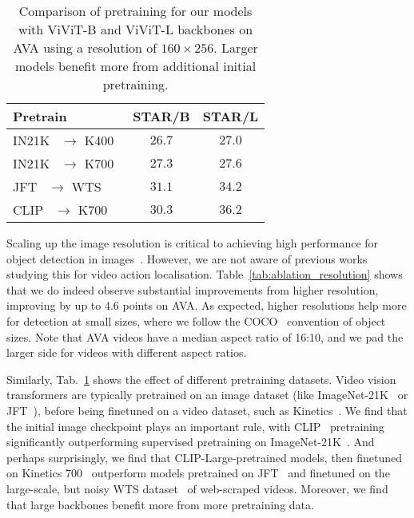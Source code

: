 \documentclass[10pt,twocolumn,letterpaper]{article}
\begin{document}
     \begin{table}[t]
\centering
\caption{
	Comparison of pretraining for our models with ViViT-B and ViViT-L backbones on AVA using a resolution of $160 \times 256$.
    Larger models benefit more from additional initial pretraining.
}
\begin{tabular}{lcc}
\toprule
Pretrain                 & STAR/B & STAR/L \\





\midrule

IN21K~\cite{deng_cvpr_2009} $\to$ K400~\cite{kay_arxiv_2017}         &   $26.7$  &  $27.0$  \\  IN21K~\cite{deng_cvpr_2009} $\to$ K700~\cite{carreira2019short}         &  $27.3$  &  $27.6$   \\  JFT~\cite{sun_iccv_2017} $\to$ WTS~\cite{stroud2020learning}          &   $\mathbf{31.1}$  &  $34.2$  \\  CLIP~\cite{radford2021learning} $\to$ K700~\cite{carreira2019short}          &  $30.3$  &  $\mathbf{36.2}$  \\  

\bottomrule
\end{tabular}
\label{tab:ablation_pretraining}
\vspace{-1.25\baselineskip}
\end{table}
 
Scaling up the image resolution is critical to achieving high performance for object detection in images~\cite{huang2017speed, singh2018analysis}.
However, we are not aware of previous works studying this for video action localisation.
Table~\ref{tab:ablation_resolution} shows that we do indeed observe substantial improvements from higher resolution, improving by up to 4.6 points on AVA.
As expected, higher resolutions help more for detection at small sizes, where we follow the COCO~\cite{lin_coco_eccv_2014} convention of object sizes.
Note that AVA videos have a median aspect ratio of 16:10, and we pad the larger side for videos with different aspect ratios.

Similarly, Tab.~\ref{tab:ablation_pretraining} shows the effect of different pretraining datasets.
Video vision transformers are typically pretrained on an image dataset (like ImageNet-21K~\cite{deng_cvpr_2009} or JFT~\cite{sun_iccv_2017}), before being finetuned on a video dataset, such as Kinetics~\cite{kay_arxiv_2017}.
We find that the initial image checkpoint plays an important rule, with CLIP~\cite{radford2021learning} pretraining significantly outperforming supervised pretraining on ImageNet-21K~\cite{dosovitskiy_iclr_2021,steiner2022train}.
And perhaps surprisingly, we find that CLIP-Large-pretrained models, then finetuned on Kinetics 700~\cite{carreira2019short} outperform models pretrained on JFT~\cite{sun_iccv_2017} and finetuned on the large-scale, but noisy WTS dataset~\cite{stroud2020learning} of web-scraped videos.
Moreover, we find that large backbones benefit more from more pretraining data.
\end{document}
